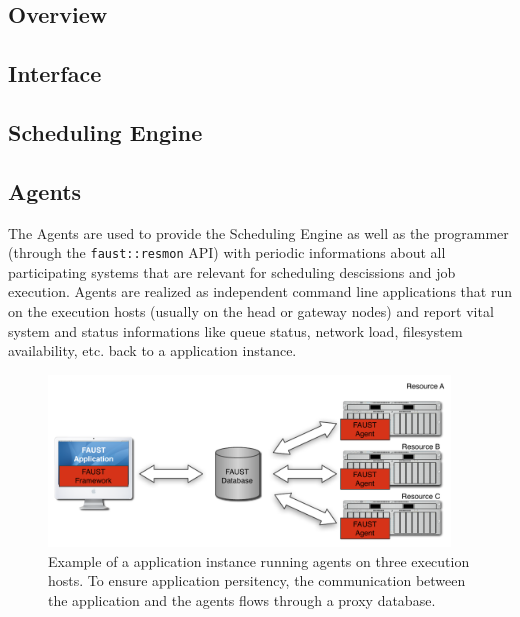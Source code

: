 \subsection{Overview}

\subsection{Interface}

\subsection{Scheduling Engine}

\subsection{Agents}

The Agents are used to provide the Scheduling Engine as well as the programmer (through the \texttt{faust::resmon} API) with periodic informations about all participating systems that are relevant for scheduling descissions and job execution. \FAUST Agents are realized as independent command line applications that run on the execution hosts (usually on the head or gateway nodes) and report vital system and status informations like queue status, network load, filesystem availability, etc. back to a \FAUST application instance.

\begin{figure}[bth!]
  \begin{center}
    \includegraphics[width=0.95\textwidth]{figures/faust_agents_01}
    \caption{\label{fig:faust_agents_01} Example of a \FAUST application 
      instance running agents on three execution hosts. To ensure 
      application persitency, the communication between the application
      and the agents flows through a proxy database. }
  \end{center}
\end{figure}

